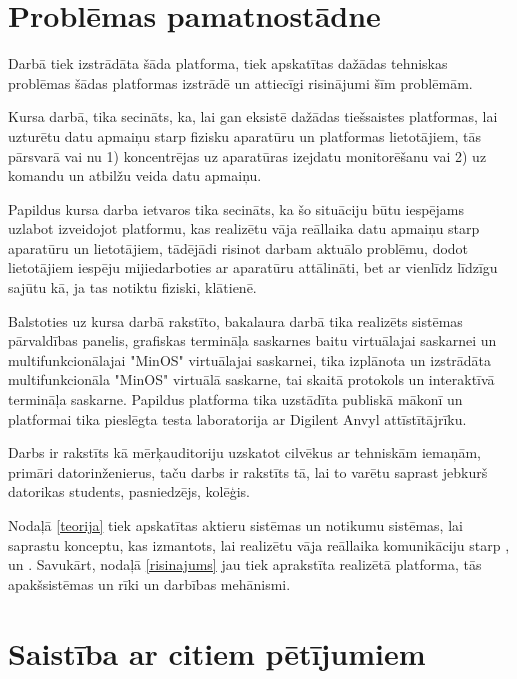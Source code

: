 \section{Problēmas pamatnostādne}

Darbā tiek izstrādāta šāda platforma, tiek apskatītas dažādas tehniskas
problēmas šādas platformas izstrādē un attiecīgi risinājumi šīm problēmām. 

Kursa darbā, tika secināts, ka, lai gan eksistē dažādas tiešsaistes platformas,
lai uzturētu datu apmaiņu starp fizisku aparatūru un platformas lietotājiem, tās
pārsvarā vai nu 1) koncentrējas uz aparatūras izejdatu monitorēšanu vai 2) uz
komandu un atbilžu veida datu apmaiņu.
\cite[para. 3]{VeinbahsKrisjanis2021}

Papildus kursa darba ietvaros tika secināts, ka šo situāciju būtu iespējams
uzlabot izveidojot platformu, kas realizētu vāja reāllaika datu apmaiņu starp
aparatūru un lietotājiem, tādējādi risinot darbam aktuālo problēmu, dodot
lietotājiem iespēju mijiedarboties ar aparatūru attālināti, bet ar vienlīdz
līdzīgu sajūtu kā, ja tas notiktu fiziski, klātienē. \cite[para.
5]{VeinbahsKrisjanis2021} 

Balstoties uz kursa darbā rakstīto, bakalaura darbā tika realizēts sistēmas
pārvaldības panelis, grafiskas termināļa saskarnes baitu virtuālajai saskarnei
un multifunkcionālajai "MinOS" virtuālajai saskarnei, tika izplānota un
izstrādāta multifunkcionāla "MinOS" virtuālā saskarne, tai skaitā protokols un
interaktīvā termināļa saskarne. Papildus platforma tika uzstādīta publiskā
mākonī un platformai tika pieslēgta testa laboratorija ar Digilent Anvyl
attīstītājrīku.

Darbs ir rakstīts kā mērķauditoriju uzskatot cilvēkus ar tehniskām iemaņām,
primāri datorinženierus, taču darbs ir rakstīts tā, lai to varētu saprast
jebkurš datorikas students, pasniedzējs, kolēģis.

Nodaļā \ref{teorija} tiek apskatītas aktieru sistēmas un notikumu sistēmas, lai
saprastu konceptu, kas izmantots, lai realizētu vāja reāllaika komunikāciju
starp ,  un
. Savukārt, nodaļā \ref{risinajums} jau tiek
aprakstīta realizētā platforma, tās apakšsistēmas un rīki un darbības mehānismi.

\section{Saistība ar citiem pētījumiem}

